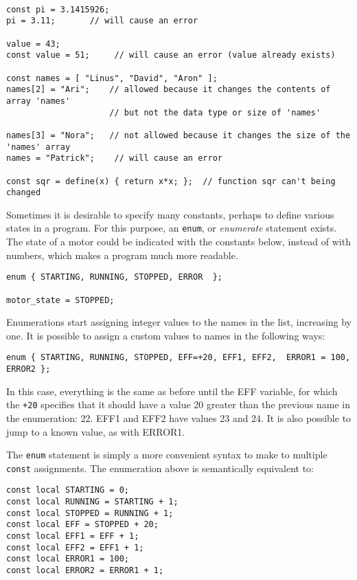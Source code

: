 \documentclass{article}
\begin{document}
\begin{verbatim}

const pi = 3.1415926;
pi = 3.11;       // will cause an error

value = 43;
const value = 51;     // will cause an error (value already exists)

const names = [ "Linus", "David", "Aron" ];
names[2] = "Ari";    // allowed because it changes the contents of array 'names'
                     // but not the data type or size of 'names'

names[3] = "Nora";   // not allowed because it changes the size of the 'names' array
names = "Patrick";    // will cause an error

const sqr = define(x) { return x*x; };  // function sqr can't being changed

\end{verbatim}


Sometimes it is desirable to specify many constants, perhaps to define various states in a program.  For this purpose, an \texttt{enum}, or \emph{enumerate} statement exists. The state of a motor could be indicated with the constants below, instead of with numbers, which makes a program much more readable.
\begin{verbatim}
enum { STARTING, RUNNING, STOPPED, ERROR  };

motor_state = STOPPED;  
\end{verbatim}

Enumerations start assigning integer values to the names in the list, increasing by one.  It is possible to assign a custom values to names in the following ways:

\begin{verbatim}
enum { STARTING, RUNNING, STOPPED, EFF=+20, EFF1, EFF2,  ERROR1 = 100, ERROR2 };
\end{verbatim}

In this case, everything is the same as before until the EFF variable, for which the \texttt{+20} specifies that it should have a value 20 greater than the previous name in the enumeration: 22.  EFF1 and EFF2 have values 23 and 24.  It is also possible to jump to a known value, as with ERROR1.

The \texttt{enum} statement is simply a more convenient syntax to make to multiple \texttt{const} assignments.  The enumeration above is semantically equivalent to:

\begin{verbatim}
const local STARTING = 0;
const local RUNNING = STARTING + 1;
const local STOPPED = RUNNING + 1;
const local EFF = STOPPED + 20;
const local EFF1 = EFF + 1;
const local EFF2 = EFF1 + 1;
const local ERROR1 = 100;
const local ERROR2 = ERROR1 + 1;
\end{verbatim}
\end{document}
